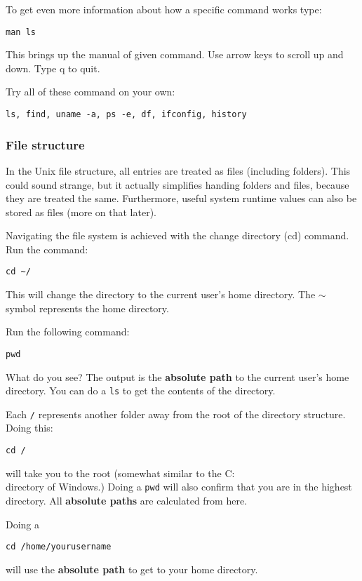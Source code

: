 \documentclass[a4paper]{article}
\begin{document}
To get even more information about how a specific command works type: 
\begin{lstlisting}
man ls
\end{lstlisting}
This brings up the manual of given command. Use arrow keys to scroll up and down. Type q to quit. 

Try all of these command on your own:
\begin{lstlisting}
ls, find, uname -a, ps -e, df, ifconfig, history
\end{lstlisting}

\subsubsection{File structure}
In the Unix file structure, all entries are treated as files (including folders). This could sound strange, but it actually simplifies handing folders and files, because they are treated the same. Furthermore, useful system runtime values can also be stored as files (more on that later). 

Navigating the file system is achieved with the change directory (cd) command. Run the command: 

\begin{lstlisting}
cd ~/
\end{lstlisting}
This will change the directory to the current user's home directory. The $\sim$ symbol represents the home directory. 

Run the following command: 
\begin{lstlisting}
pwd
\end{lstlisting}
What do you see? The output is the \textbf{absolute path} to the current user's home directory. You can do a \texttt{ls} to get the contents of the directory. 

Each \texttt{/} represents another folder away from the root of the directory structure. Doing this:
\begin{lstlisting}
cd /
\end{lstlisting}
will take you to the root (somewhat similar to the C:\\ directory of Windows.) Doing a \texttt{pwd} will also confirm that you are in the highest directory. All \textbf{absolute paths} are calculated from here.

Doing a 
\begin{lstlisting}
cd /home/yourusername
\end{lstlisting}
will use the \textbf{absolute path} to get to your home directory.
\end{document}
